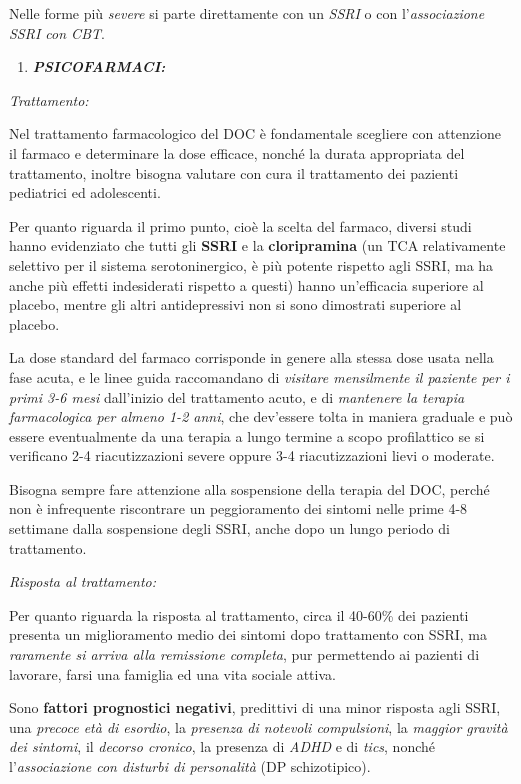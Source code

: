 \documentclass[]{article}
\begin{document}
Nelle forme più \emph{severe} si parte direttamente con un \emph{SSRI} o
con l'\emph{associazione SSRI con CBT}.

\begin{enumerate}
\def\labelenumi{\arabic{enumi}.}
\item
  \textbf{\emph{PSICOFARMACI:}}
\end{enumerate}

\emph{\emph{Trattamento:}}

Nel trattamento farmacologico del DOC è fondamentale scegliere con
attenzione il farmaco e determinare la dose efficace, nonché la durata
appropriata del trattamento, inoltre bisogna valutare con cura il
trattamento dei pazienti pediatrici ed adolescenti.

Per quanto riguarda il primo punto, cioè la scelta del farmaco, diversi
studi hanno evidenziato che tutti gli \textbf{SSRI} e la
\textbf{cloripramina} (un TCA relativamente selettivo per il sistema
serotoninergico, è più potente rispetto agli SSRI, ma ha anche più
effetti indesiderati rispetto a questi) hanno un'efficacia superiore al
placebo, mentre gli altri antidepressivi non si sono dimostrati
superiore al placebo.

La dose standard del farmaco corrisponde in genere alla stessa dose
usata nella fase acuta, e le linee guida raccomandano di \emph{visitare
mensilmente il paziente per i primi 3-6 mesi} dall'inizio del
trattamento acuto, e di \emph{mantenere la terapia farmacologica per
almeno 1-2 anni}, che dev'essere tolta in maniera graduale e può essere
eventualmente da una terapia a lungo termine a scopo profilattico se si
verificano 2-4 riacutizzazioni severe oppure 3-4 riacutizzazioni lievi o
moderate.

Bisogna sempre fare attenzione alla sospensione della terapia del DOC,
perché non è infrequente riscontrare un peggioramento dei sintomi nelle
prime 4-8 settimane dalla sospensione degli SSRI, anche dopo un lungo
periodo di trattamento.

\emph{\emph{Risposta al trattamento:}}

Per quanto riguarda la risposta al trattamento, circa il 40-60\% dei
pazienti presenta un miglioramento medio dei sintomi dopo trattamento
con SSRI, ma \emph{raramente si arriva alla remissione completa}, pur
permettendo ai pazienti di lavorare, farsi una famiglia ed una vita
sociale attiva.

Sono \textbf{fattori prognostici negativi}, predittivi di una minor
risposta agli SSRI, una \emph{precoce età di esordio}, la \emph{presenza
di notevoli compulsioni}, la \emph{maggior gravità dei sintomi}, il
\emph{decorso cronico}, la presenza di \emph{ADHD} e di \emph{tics},
nonché l'\emph{associazione con disturbi di personalità} (DP
schizotipico).
\end{document}
